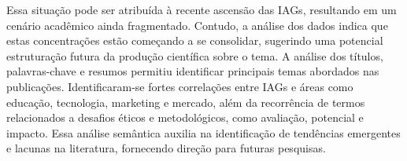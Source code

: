 \documentclass[openany,oneside,a4paper,11pt]{extarticle}
\begin{document}
 Essa situação pode ser atribuída à recente ascensão das IAGs, resultando em um cenário acadêmico ainda fragmentado. Contudo, a análise dos dados indica que estas concentrações estão começando a se consolidar, sugerindo uma potencial estruturação futura da produção científica sobre o tema. A análise dos títulos, palavras-chave e resumos permitiu identificar principais temas abordados nas publicações. Identificaram-se fortes correlações entre IAGs e áreas como educação, tecnologia, marketing e mercado, além da recorrência de termos relacionados a desafios éticos e metodológicos, como avaliação, potencial e impacto. Essa análise semântica auxilia na identificação de tendências emergentes e lacunas na literatura, fornecendo direção para futuras pesquisas.
 
\printbibliography
\end{document}
